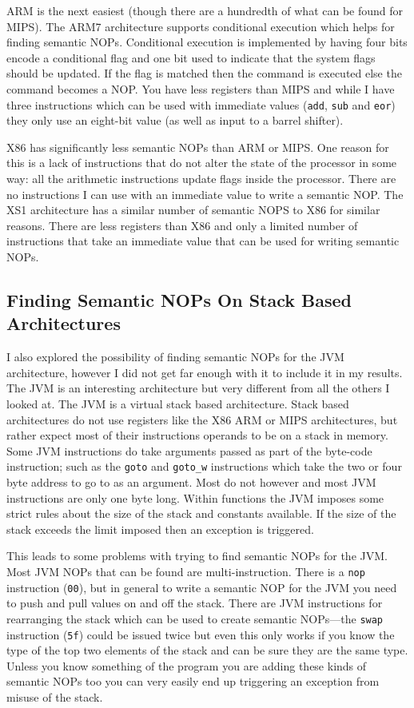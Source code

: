 \documentclass[10pt,]{book}
\begin{document}
ARM is the next easiest (though there are a hundredth of what can be
found for MIPS). The ARM7 architecture supports conditional execution
which helps for finding semantic NOPs. Conditional execution is
implemented by having four bits encode a conditional flag and one bit
used to indicate that the system flags should be
updated\autocite{Seal:2000vd}. If the flag is matched then the command
is executed else the command becomes a NOP. You have less registers than
MIPS and while I have three instructions which can be used with
immediate values (\lstinline!add!, \lstinline!sub! and \lstinline!eor!)
they only use an eight-bit value (as well as input to a barrel shifter).

X86 has significantly less semantic NOPs than ARM or MIPS. One reason
for this is a lack of instructions that do not alter the state of the
processor in some way: all the arithmetic instructions update flags
inside the processor. There are no instructions I can use with an
immediate value to write a semantic NOP. The XS1 architecture has a
similar number of semantic NOPS to X86 for similar reasons. There are
less registers than X86 and only a limited number of instructions that
take an immediate value that can be used for writing semantic NOPs.

\subsection{Finding Semantic NOPs On Stack Based Architectures}

I also explored the possibility of finding semantic NOPs for the JVM
architecture, however I did not get far enough with it to include it in
my results. The JVM is an interesting architecture but very different
from all the others I looked at. The JVM is a virtual stack based
architecture\autocite{Lindholm:2012wy}. Stack based architectures do not
use registers like the X86 ARM or MIPS architectures, but rather expect
most of their instructions operands to be on a stack in memory. Some JVM
instructions do take arguments passed as part of the byte-code
instruction; such as the \lstinline!goto! and \lstinline!goto_w!
instructions which take the two or four byte address to go to as an
argument. Most do not however and most JVM instructions are only one
byte long. Within functions the JVM imposes some strict rules about the
size of the stack and constants available. If the size of the stack
exceeds the limit imposed then an exception is triggered.

This leads to some problems with trying to find semantic NOPs for the
JVM. Most JVM NOPs that can be found are multi-instruction. There is a
\lstinline!nop! instruction (\lstinline!00!), but in general to write a
semantic NOP for the JVM you need to push and pull values on and off the
stack. There are JVM instructions for rearranging the stack which can be
used to create semantic NOPs---the \lstinline!swap! instruction
(\lstinline!5f!) could be issued twice but even this only works if you
know the type of the top two elements of the stack and can be sure they
are the same type. Unless you know something of the program you are
adding these kinds of semantic NOPs too you can very easily end up
triggering an exception from misuse of the stack.
\end{document}
